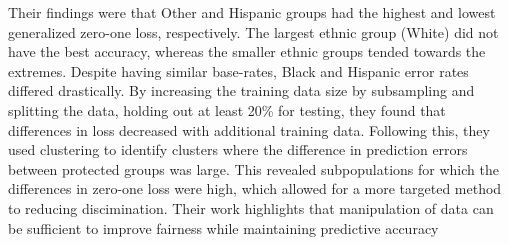 \documentclass[12pt]{article}
\begin{document}
Their findings were that Other and Hispanic groups had the highest and lowest generalized zero-one loss, respectively. The largest ethnic group (White) did not have the best accuracy, whereas the smaller ethnic groups tended towards the extremes. Despite having similar base-rates, Black and Hispanic error rates differed drastically. By increasing the training data size by subsampling and splitting the data, holding out at least 20\% for testing, they found that differences in loss decreased with additional training data. Following this, they used clustering to identify clusters where the difference in prediction errors between protected groups was large. This revealed subpopulations for which the differences in zero-one loss were high, which allowed for a more targeted method to reducing discimination. Their work highlights that manipulation of data can be sufficient to improve fairness while maintaining predictive accuracy \citep{Chen_2018}

\newpage


\end{document}

